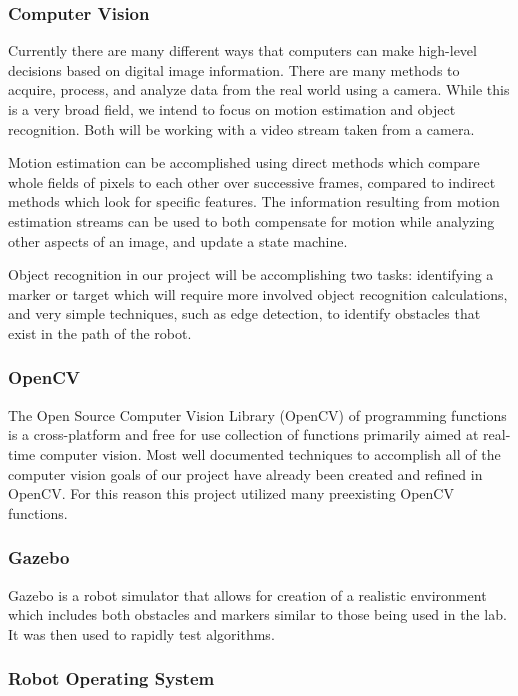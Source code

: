 \documentclass{article}[12]
\begin{document}
		\subsubsection{Computer Vision}
		
		Currently there are many different ways that computers can make high-level decisions based on digital image information. There are many methods to acquire, process, and analyze data from the real world using a camera. While this is a very broad field, we intend to focus on motion estimation and object recognition. Both will be working with a video stream taken from a camera. 
		
		Motion estimation can be accomplished using direct methods which compare whole fields of pixels to each other over successive frames, compared to indirect methods which look for specific features. The information resulting from motion estimation streams can be used to both compensate for motion while analyzing other aspects of an image, and update a state machine.
		
		Object recognition in our project will be accomplishing two tasks: identifying a marker or target which will require more involved object recognition calculations, and very simple techniques, such as edge detection, to identify obstacles that exist in the path of the robot.
		
		\subsubsection{OpenCV}
		
		The Open Source Computer Vision Library (OpenCV) of programming functions is a cross-platform and free for use collection of functions primarily aimed at real-time computer vision\cite{opencv}. Most well documented techniques to accomplish all of the computer vision goals of our project have already been created and refined in OpenCV.\cite{woods2015dynamic} For this reason this project utilized many preexisting OpenCV functions.
		
		\subsubsection{Gazebo}
		
		Gazebo is a robot simulator that allows for creation of a realistic environment which includes both obstacles and markers similar to those being used in the lab. It was then used to rapidly test algorithms.
		
		\subsubsection{Robot Operating System}
		
\end{document}

